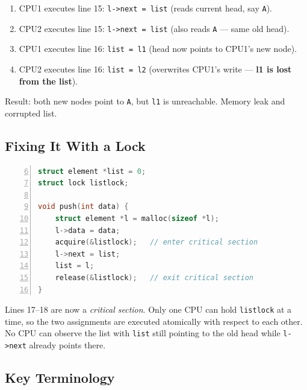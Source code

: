 \documentclass[11pt, a4paper]{article}
\begin{document}
\begin{tcolorbox}[race, title={What Goes Wrong}]
\begin{enumerate}[leftmargin=1.8em, itemsep=0.2em]
  \item CPU1 executes line 15: \lstinline|l->next = list| (reads current head, say \lstinline|A|).
  \item CPU2 executes line 15: \lstinline|l->next = list| (also reads \lstinline|A| --- same old head).
  \item CPU1 executes line 16: \lstinline|list = l1| (head now points to CPU1's new node).
  \item CPU2 executes line 16: \lstinline|list = l2| (overwrites CPU1's write --- \textbf{l1 is lost from the list}).
\end{enumerate}
Result: both new nodes point to \lstinline|A|, but \lstinline|l1| is unreachable. Memory leak and corrupted list.
\end{tcolorbox}

\subsection{Fixing It With a Lock}

\begin{lstlisting}[language=C, numbers=left, firstnumber=6]
struct element *list = 0;
struct lock listlock;

void push(int data) {
    struct element *l = malloc(sizeof *l);
    l->data = data;
    acquire(&listlock);   // enter critical section
    l->next = list;
    list = l;
    release(&listlock);   // exit critical section
}
\end{lstlisting}

\begin{tcolorbox}[good, title={Why This Is Correct}]
Lines 17--18 are now a \emph{critical section}. Only one CPU can hold \lstinline|listlock| at a time, so the two assignments are executed atomically with respect to each other. No CPU can observe the list with \lstinline|list| still pointing to the old head while \lstinline|l->next| already points there.
\end{tcolorbox}

\subsection{Key Terminology}
\end{document}
